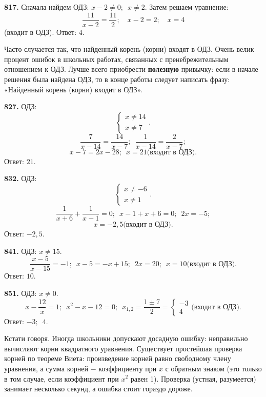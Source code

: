 \textbf{817.}  Сначала найдем ОДЗ: $x-2\ne0;\enspace x\ne2$. Затем  решаем уравнение: $$\frac{11}{x-2}=\frac{11}{2};\quad x-2=2;\quad x=4$$ (входит в ОДЗ). \newline \null \hspace*{\fill} Ответ: $4$.

Часто случается так, что найденный корень (корни) входят в ОДЗ. Очень велик процент ошибок в школьных работах,  связанных  с пренебрежительным отношением к ОДЗ. Лучше всего приобрести \textbf{полезную} привычку: если в начале решения была найдена ОДЗ, то в конце работы следует написать фразу: «Найденный корень (корни) входит в ОДЗ».  

\textbf{827.} ОДЗ: $$\begin{cases} x\ne 14 \\ x\ne 7\end{cases}.$$$$\frac{7}{x-14}=\frac{14}{x-7};\enspace \frac{1}{x-14}=\frac{2}{x-7};$$$$ x-7=2x-28;\enspace x=21\text{(входит в ОДЗ).}$$ \newline \null \hspace*{\fill} Ответ: $21$.

\textbf{832.} ОДЗ: $$\begin{cases} x\ne -6 \\ x\ne 1\end{cases}.$$ $$\frac{1}{x+6}+\frac{1}{x-1}=0;\enspace x-1+x+6=0;\enspace 2x=-5;$$$$ x=-2,5\text{(входит в ОДЗ)}.$$
\newline \null \hspace*{\fill} Ответ: $-2,5$.

\newpage\textbf{841.} ОДЗ: $x\ne15$. $$\frac{x-5}{x-15}=-1;\enspace x-5=-x+15;\enspace 2x=20;\enspace x=10\text{(входит в ОДЗ)}.$$ \newline \null \hspace*{\fill} Ответ: $10$.

\textbf{851.} ОДЗ: $x\ne0$.$$x-\frac{12}{x}=1;\enspace x^2-x-12=0;\enspace x_{1,2}=\frac{1\pm7}{2}=\begin{cases} -3 \\ 4 \end{cases}\text{(входит в ОДЗ)}.$$ \newline \null \hspace*{\fill} Ответ: $-3;\enspace 4$.

Кстати говоря. Иногда школьники допускают досадную ошибку: неправильно вычисляют корни квадратного уравнения. Существует простейшая проверка корней по теореме Виета: произведение корней равно свободному члену уравнения, а сумма корней $-$ коэффициенту при $x$ с обратным знаком (это только в том случае, если коэффициент при $x^2$  равен 1). Проверка (устная, разумеется) занимает несколько секунд, а ошибка стоит гораздо дороже. 

